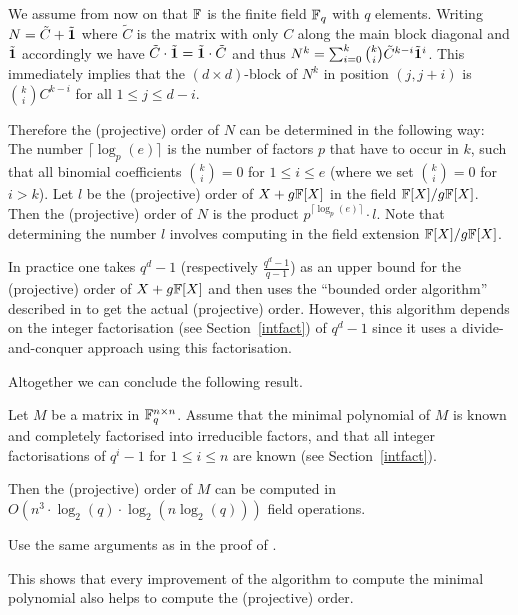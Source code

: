 We assume from now on that $\mathbb{F}$ is the finite field $\mathbb{F}_q$ with $q$
elements.
Writing $N = \tilde C + \tilde {\mathbf{1}}$ where $\tilde C$ is the matrix
with only $C$ along the main block diagonal and $\tilde {\mathbf{1}}$
accordingly we have $\tilde C \cdot \tilde {\mathbf{1}} = \tilde {\mathbf{1}} \cdot \tilde C$
and thus $N^k = \sum_{i=0}^k {k \choose i} \tilde C^{k-i} \tilde
{\mathbf{1}}^i$. This immediately implies that the $(d \times d)$-block
of $N^k$ in position $(j,j+i)$ is ${k \choose i}C^{k-i}$ for all
$1 \le j \le d-i$. 

Therefore the (projective) order of $N$ can be determined in the
following way: The number $\lceil \log_p(e)\rceil$ is the number
of factors $p$ that have to occur in $k$, such that all binomial
coefficients ${k \choose i} = 0$ for $1 \le i \le e$ (where we set ${k
\choose i} = 0$ for $i > k$). Let $l$ be the (projective) order of
$X+g\mathbb{F}[X]$ in the field $\mathbb{F}[X]/g\mathbb{F}[X]$. Then the (projective) order of
$N$ is the product $p^{\lceil \log_p(e) \rceil} \cdot l$. Note that
determining the number $l$ involves computing in the field extension
$\mathbb{F}[X]/g\mathbb{F}[X]$.

In practice one takes $q^d-1$ (respectively $\frac{q^d-1}{q-1}$) 
as an upper bound
for the (projective) order of $X+g\mathbb{F}[X]$ and then uses the ``bounded order
algorithm'' described in \cite[Section 2]{CellLeedOrder} to get the
actual (projective) order. However, this algorithm depends on the
integer factorisation (see Section~\ref{intfact}) 
of $q^d-1$ since it uses a divide-and-conquer
approach using this factorisation.

Altogether we can conclude the following result.

\begin{Prop}
Let $M$ be a matrix in $\mathbb{F}_q^{n \times n}$. Assume that the 
minimal polynomial of $M$ is known and completely factorised into
irreducible factors, and that all integer factorisations of $q^i-1$
for $1 \le i \le n$ are known (see Section~\ref{intfact}). 

Then the (projective) order of $M$ can be
computed in $O(n^3 \cdot \log_2(q) \cdot \log_2(n\log_2(q)))$
field operations.
\end{Prop}
\proofbeg Use the same arguments as in the proof of 
\cite[\textsc{Order Algorithm}]{CellLeedOrder}. 
\proofend

\begin{Rem}
This shows that every improvement of the algorithm to compute the
minimal polynomial also helps to compute the (projective) order.
\end{Rem}

